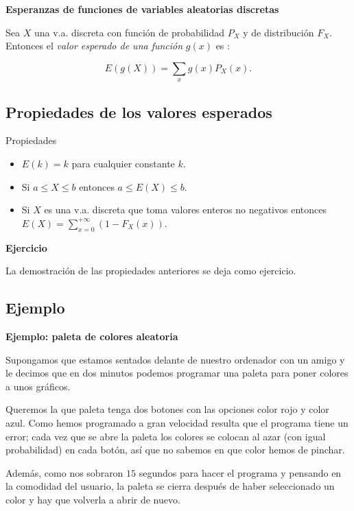 \documentclass[]{book}
\providecommand{\tightlist}{%
  \setlength{\itemsep}{0pt}\setlength{\parskip}{0pt}}
\begin{document}
 \textbf{Esperanzas de funciones de variables aleatorias discretas}

Sea \(X\) una v.a. discreta con función de probabilidad \(P_{X}\) y de distribución
\(F_{X}\). Entonces el \emph{valor esperado de una función} \(g(x)\) es :

\[E(g(X))=\sum_{x}g(x) P_{X}(x).\]

\hypertarget{propiedades-de-los-valores-esperados}{%
\subsection{Propiedades de los valores esperados}\label{propiedades-de-los-valores-esperados}}

 Propiedades

\begin{itemize}
\tightlist
\item
  \(E(k)=k\) para cualquier constante \(k\).
\item
  Si \(a\leq X\leq b\) entonces \(a\leq E(X)\leq b\).
\item
  Si \(X\) es una v.a. discreta que toma valores enteros no negativos entonces
  \(E(X)=\sum_{x=0}^{+\infty}(1- F_X(x)).\)
\end{itemize}

\textbf{Ejercicio}

La demostración de las propiedades anteriores se deja como ejercicio.

\hypertarget{ejemplo-14}{%
\subsection{Ejemplo}\label{ejemplo-14}}

\textbf{Ejemplo: paleta de colores aleatoria}

Supongamos que estamos sentados delante de nuestro ordenador con un amigo y
le decimos que en dos minutos podemos programar una paleta para poner colores a unos
gráficos.

Queremos la que paleta tenga dos botones con las opciones color rojo y color azul.
Como hemos programado a gran velocidad resulta que el programa tiene un error; cada vez que
se abre la paleta los colores se colocan al azar (con igual probabilidad) en cada botón,
así que no sabemos en que color hemos de pinchar.

Además, como nos sobraron \(15\) segundos
para hacer el programa y pensando en la comodidad del usuario, la paleta se cierra después de haber seleccionado un
color y hay que volverla a abrir de nuevo.
\end{document}
